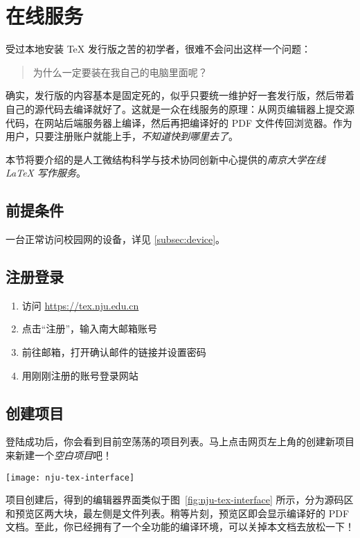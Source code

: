 \section{在线服务}
\label{sec:online}

\begin{widepar}
受过本地安装 \TeX{} 发行版之苦的初学者，很难不会问出这样一个问题：
\end{widepar}

\begin{quote}
\kaishu 为什么一定要装在我自己的电脑里面呢？
\end{quote}

\begin{widepar}
确实，发行版的内容基本是固定死的，似乎只要统一维护好一套发行版，然后带着自己的源代码去编译就好了。这就是一众在线服务的原理：从网页编辑器上提交源代码，在网站后端服务器上编译，然后再把编译好的 PDF 文件传回浏览器。作为用户，只要注册账户就能上手，\emph{不知道快到哪里去了}。
\end{widepar}

\medskip

本节将要介绍的是人工微结构科学与技术协同创新中心提供的\emph{南京大学在线 \LaTeX{} 写作服务}。

\subsection{前提条件}

一台正常访问校园网的设备，详见 \ref{subsec:device}。

\subsection{注册登录}

\begin{enumerate}
  \item 访问 \url{https://tex.nju.edu.cn}
  \item 点击“注册”，输入南大邮箱账号
  \item 前往邮箱，打开确认邮件的链接并设置密码
  \item 用刚刚注册的账号登录网站
\end{enumerate}

\subsection{创建项目}

登陆成功后，你会看到目前空荡荡的项目列表。马上点击网页左上角的\textcolor{olgreen}{创建新项目}来新建一个\emph{空白项目}吧！

\begin{figure*}[htbp]
  \caption{编辑器主界面，鼠标悬停在网页中相关图标上会显示说明。}
  \label{fig:nju-tex-interface}
  \texttt{[image: nju-tex-interface]}
\end{figure*}

项目创建后，得到的编辑器界面类似于图~\ref{fig:nju-tex-interface} 所示，分为源码区和预览区两大块，最左侧是文件列表。稍等片刻，预览区即会显示编译好的 PDF 文档。至此，你已经拥有了一个全功能的编译环境，可以关掉本文档去放松一下！
